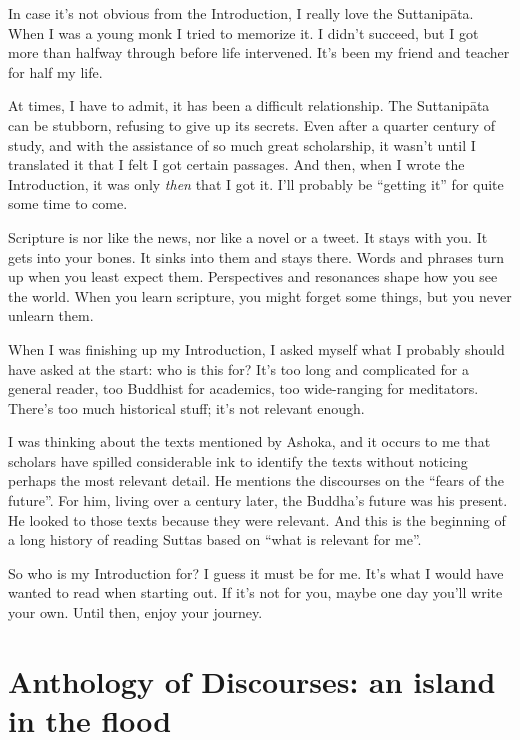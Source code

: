 \documentclass[12pt,openany]{book}%
\begin{document}
In case it’s not obvious from the Introduction, I really love the \textsanskrit{Suttanipāta}. When I was a young monk I tried to memorize it. I didn’t succeed, but I got more than halfway through before life intervened. It’s been my friend and teacher for half my life.

At times, I have to admit, it has been a difficult relationship. The \textsanskrit{Suttanipāta} can be stubborn, refusing to give up its secrets. Even after a quarter century of study, and with the assistance of so much great scholarship, it wasn’t until I translated it that I felt I got certain passages. And then, when I wrote the Introduction, it was only \emph{then} that I got it. I’ll probably be “getting it” for quite some time to come.

Scripture is nor like the news, nor like a novel or a tweet. It stays with you. It gets into your bones. It sinks into them and stays there. Words and phrases turn up when you least expect them. Perspectives and resonances shape how you see the world. When you learn scripture, you might forget some things, but you never unlearn them.

When I was finishing up my Introduction, I asked myself what I probably should have asked at the start: who is this for? It’s too long and complicated for a general reader, too Buddhist for academics, too wide-ranging for meditators. There’s too much historical stuff; it’s not relevant enough.

I was thinking about the texts mentioned by Ashoka, and it occurs to me that scholars have spilled considerable ink to identify the texts without noticing perhaps the most relevant detail. He mentions the discourses on the “fears of the future”. For him, living over a century later, the Buddha’s future was his present. He looked to those texts because they were relevant. And this is the beginning of a long history of reading Suttas based on “what is relevant for me”.

So who is my Introduction for? I guess it must be for me. It’s what I would have wanted to read when starting out. If it’s not for you, maybe one day you’ll write your own. Until then, enjoy your journey.

%
\chapter*{Anthology of Discourses: an island in the flood}
\end{document}
